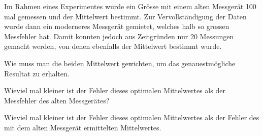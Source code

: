 Im Rahmen eines Experimentes wurde ein Grösse mit einem alten Messgerät
100 mal gemessen und der Mittelwert bestimmt.
Zur Vervollständigung der Daten wurde dann ein moderneres Messgerät
gemietet, welches halb so grossen Messfehler hat.
Damit konnten jedoch aus Zeitgründen nur 20 Messungen gemacht werden,
von denen ebenfalls der Mittelwert bestimmt wurde.
\begin{teilaufgaben}
\item
Wie muss man die beiden Mittelwert gewichten, um das genauestmögliche
Resultat zu erhalten.
\item
Wieviel mal kleiner ist der Fehler dieses optimalen Mittelwertes als 
der Messfehler des alten Messgerätes?
\item
Wieviel mal kleiner ist der Fehler dieses optimalen Mittelwertes als
der Fehler des mit dem alten Messgerät ermittelten Mittelwertes.
\end{teilaufgaben}


